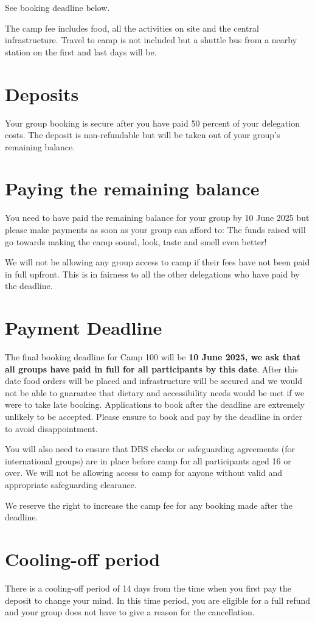 \documentclass[a4paper, 11pt]{report}
\begin{document}
See booking deadline below.

The camp fee includes food, all the activities on site and the central infrastructure. Travel to camp is not included but a shuttle bus from a nearby station on the first and last days will be. 

\section{Deposits}
Your group booking is secure after you have paid 50 percent of your delegation costs. The deposit is non-refundable but will be taken out of your group's remaining balance.

\section{Paying the remaining balance}
You need to have paid the remaining balance for your group by 10 June 2025 but please make payments as soon as your group can afford to: The funds raised will go towards making the camp sound, look, taste and smell even better! 

We will not be allowing any group access to camp if their fees have not been paid in full upfront. This is in fairness to all the other delegations who have paid by the deadline.

\section{Payment Deadline}
The final booking deadline for Camp 100 will be \textbf{10 June 2025, we ask that all groups have paid in full for all participants by this date}. After this date food orders will be placed and infrastructure will be secured and we would not be able to guarantee that dietary and accessibility needs would be met if we were to take late booking. Applications to book after the deadline are extremely unlikely to be accepted. Please ensure to book and pay by the deadline in order to avoid disappointment. 

You will also need to ensure that DBS checks or safeguarding agreements (for international groups) are in place before camp for all participants aged 16 or over. We will not be allowing access to camp for anyone without valid and appropriate safeguarding clearance. 

We reserve the right to increase the camp fee for any booking made after the deadline.

\section{Cooling-off period}
There is a cooling-off period of 14 days from the time when you first pay the deposit to change your mind. In this time period, you are eligible for a full refund and your group does not have to give a reason for the cancellation. 
\end{document}
